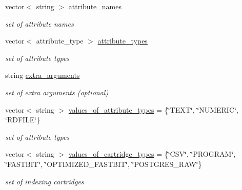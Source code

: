 \begin{DoxyCompactItemize}
\mbox{\label{classRawDataIndexer_a6ebb8467c0e46140a87261ae569d1cec}} 
vector$<$ string $>$ \hyperlink{classRawDataIndexer_a6ebb8467c0e46140a87261ae569d1cec}{attribute\+\_\+names}
\begin{DoxyCompactList}\small\item\em set of attribute names \end{DoxyCompactList}\item 
\mbox{\label{classRawDataIndexer_aa9b5a06fe603ed2e0b2c1b7cdf0b704a}} 
vector$<$ attribute\+\_\+type $>$ \hyperlink{classRawDataIndexer_aa9b5a06fe603ed2e0b2c1b7cdf0b704a}{attribute\+\_\+types}
\begin{DoxyCompactList}\small\item\em set of attribute types \end{DoxyCompactList}\item 
\mbox{\label{classRawDataIndexer_a119dc6915990b3383d131fef420aac07}} 
string \hyperlink{classRawDataIndexer_a119dc6915990b3383d131fef420aac07}{extra\+\_\+arguments}
\begin{DoxyCompactList}\small\item\em set of extra arguments (optional) \end{DoxyCompactList}\item 
\mbox{\label{classRawDataIndexer_afd42049b83834d6bfac7d0fa470c3a81}} 
vector$<$ string $>$ \hyperlink{classRawDataIndexer_afd42049b83834d6bfac7d0fa470c3a81}{values\+\_\+of\+\_\+attribute\+\_\+types} = \{\char`\"{}T\+E\+XT\char`\"{}, \char`\"{}N\+U\+M\+E\+R\+IC\char`\"{}, \char`\"{}R\+D\+F\+I\+LE\char`\"{}\}
\begin{DoxyCompactList}\small\item\em set of attribute types \end{DoxyCompactList}\item 
\mbox{\label{classRawDataIndexer_a7a2f2df084c31cd583562bf2f6508ddb}} 
vector$<$ string $>$ \hyperlink{classRawDataIndexer_a7a2f2df084c31cd583562bf2f6508ddb}{values\+\_\+of\+\_\+cartridge\+\_\+types} = \{\char`\"{}C\+SV\char`\"{}, \char`\"{}P\+R\+O\+G\+R\+AM\char`\"{}, \char`\"{}F\+A\+S\+T\+B\+IT\char`\"{}, \char`\"{}O\+P\+T\+I\+M\+I\+Z\+E\+D\+\_\+\+F\+A\+S\+T\+B\+IT\char`\"{}, \char`\"{}P\+O\+S\+T\+G\+R\+E\+S\+\_\+\+R\+AW\char`\"{}\}
\begin{DoxyCompactList}\small\item\em set of indexing cartridges \end{DoxyCompactList}\end{DoxyCompactItemize}


